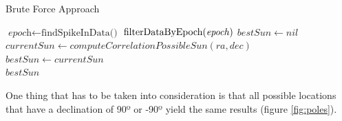 \begin{algorithm}
	\caption{Brute Force Approach}\label{pseudocodeBruteForce}
	\begin{algorithmic}[1]
		\State $\textit{epoch} \gets \text{findSpikeInData()}$ 
		\State $\text{filterDataByEpoch(\textit{epoch})}$
		\State $bestSun \gets nil$
		\State $currentSun \gets computeCorrelationPossibleSun(ra, dec)$
		\State $bestSun \gets currentSun$
		\EndIf
		\EndFor
		\EndFor
		\\
		\Return $bestSun$
		\EndProcedure
	\end{algorithmic}
\end{algorithm}

\clearpage

One thing that has to be taken into consideration is that all possible locations that have a declination of 90º or -90º yield the same results (figure \ref{fig:poles}).

